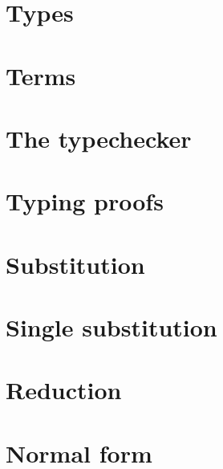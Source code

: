 \documentclass[
fontsize=11pt,
twoside
]{scrreprt}
\begin{document}
\section{Types}

\section{Terms}



\section{The typechecker}




\section{Typing proofs}


\section{Substitution}



\section{Single substitution}



\section{Reduction}


\section{Normal form}



\end{document}
